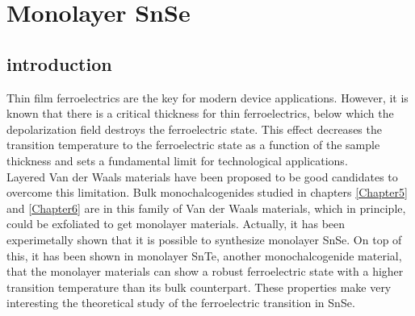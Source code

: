
\chapter{Monolayer SnSe} %

\label{Chapter7} %




\section{introduction}

Thin film ferroelectrics are the key for modern device applications\cite{lallart2011ferroelectrics}. However, it is 
known that there is a critical thickness for thin ferroelectrics, below which the depolarization field destroys the 
ferroelectric state\cite{batra1973new,zhong1994giant,dawber2005physics}. This effect decreases the transition 
temperature to the ferroelectric state as a function of the sample 
thickness\cite{fong2004ferroelectricity,fong2006stabilization} and sets a fundamental limit for technological  
applications. \\

Layered Van der Waals materials have been proposed to be good candidates to overcome this 
limitation\cite{shirodkar2014emergence,fei2016ferroelectricity}. 
Bulk monochalcogenides studied in chapters \ref{Chapter5} and \ref{Chapter6} are in this family of Van der Waals 
materials, which in principle, could be exfoliated to get monolayer materials. Actually, it has been experimetally 
shown that it is possible to synthesize monolayer SnSe\cite{li2013single,zhao2015controlled}. On top of this, it has 
been shown in monolayer SnTe, another monochalcogenide material, that the monolayer materials can show a robust 
ferroelectric state with a higher transition temperature than its bulk counterpart\cite{chang2016discovery}. These 
properties make very interesting the theoretical study of the ferroelectric transition in SnSe. \\

